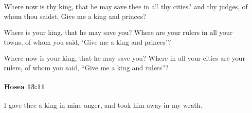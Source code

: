 			\begin{versebox}
					\item[BHS] 
					\item[LXX] 
					\item[ASV] Where now is thy king, that he may save thee in all thy cities? and thy judges, of whom thou saidst, Give me a king and princes?
					\item[NIV] Where is your king, that he may save you? Where are your rulers in all your towns, of whom you said, ‘Give me a king and princes’?
					\item[NRSV] Where now is your king, that he may save you? Where in all your cities are your rulers, of whom you said, “Give me a king and rulers”?
			\end{versebox}

		\paragraph{Hosea 13:11} %
			\label{HOSEA-13-11}

			I gave thee a king in mine anger, and took him away in my wrath.

